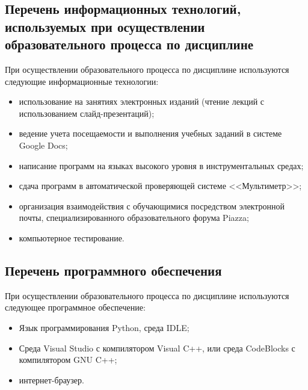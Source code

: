 \documentclass[a4paper,12pt]{article}
\begin{document}
\subsection{Перечень информационных технологий, используемых при осуществлении образовательного процесса по дисциплине}

При осуществлении образовательного процесса по дисциплине используются следующие информационные технологии:
\begin{itemize}[nolistsep]
  
\item использование на занятиях электронных изданий (чтение лекций с использованием слайд-презентаций);
  
\item ведение учета посещаемости и выполнения учебных заданий в системе Google Docs;
  
\item написание программ на языках высокого уровня в инструментальных средах;
  
\item сдача программ в автоматической проверяющей системе <<Мультиметр>>;
  
\item организация взаимодействия с обучающимися посредством электронной почты, специализированного образовательного форума Piazza;
  
\item компьютерное тестирование.
  
\end{itemize}

\subsection{Перечень программного обеспечения}
При осуществлении образовательного процесса по дисциплине используются следующее программное обеспечение:
\begin{itemize}[nolistsep]
  
\item Язык программирования Python, среда IDLE;
  
\item Среда Visual Studio с компилятором Visual C++, или среда CodeBlocks с компилятором GNU C++;
  
\item интернет-браузер.
  
\end{itemize}
\end{document}
